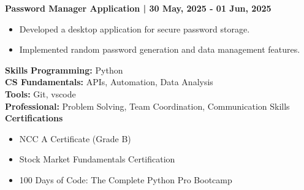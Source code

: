 \documentclass[10pt]{article}
\begin{document}
\textbf{Password Manager Application | 30 May, 2025 - 01 Jun, 2025}
\begin{itemize}
\item Developed a desktop application for secure password storage.
\item Implemented random password generation and data management features.
\end{itemize}

\textbf{Skills}
\textbf{Programming:} Python\\
\textbf{CS Fundamentals:} APIs, Automation, Data Analysis\\
\textbf{Tools:} Git, vscode\\
\textbf{Professional:} Problem Solving, Team Coordination, Communication Skills\\

\textbf{Certifications}
\begin{itemize}
\item NCC A Certificate (Grade B)
\item Stock Market Fundamentals Certification
\item 100 Days of Code: The Complete Python Pro Bootcamp
\end{itemize}
\end{document}
